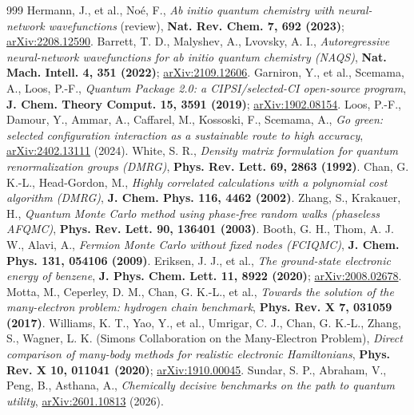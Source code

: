 \documentclass[11pt]{article}
\begin{document}
\begin{thebibliography}{999}
 Hermann, J., et al., Noé, F., \emph{Ab initio quantum chemistry with neural-network wavefunctions} (review), \textbf{Nat. Rev. Chem. 7, 692 (2023)}; \href{https://arxiv.org/abs/2208.12590}{arXiv:2208.12590}.
 Barrett, T. D., Malyshev, A., Lvovsky, A. I., \emph{Autoregressive neural-network wavefunctions for ab initio quantum chemistry (NAQS)}, \textbf{Nat. Mach. Intell. 4, 351 (2022)}; \href{https://arxiv.org/abs/2109.12606}{arXiv:2109.12606}.
 Garniron, Y., et al., Scemama, A., Loos, P.-F., \emph{Quantum Package 2.0: a CIPSI/selected-CI open-source program}, \textbf{J. Chem. Theory Comput. 15, 3591 (2019)}; \href{https://arxiv.org/abs/1902.08154}{arXiv:1902.08154}.
 Loos, P.-F., Damour, Y., Ammar, A., Caffarel, M., Kossoski, F., Scemama, A., \emph{Go green: selected configuration interaction as a sustainable route to high accuracy}, \href{https://arxiv.org/abs/2402.13111}{arXiv:2402.13111} (2024).
 White, S. R., \emph{Density matrix formulation for quantum renormalization groups (DMRG)}, \textbf{Phys. Rev. Lett. 69, 2863 (1992)}.
 Chan, G. K.-L., Head-Gordon, M., \emph{Highly correlated calculations with a polynomial cost algorithm (DMRG)}, \textbf{J. Chem. Phys. 116, 4462 (2002)}.
 Zhang, S., Krakauer, H., \emph{Quantum Monte Carlo method using phase-free random walks (phaseless AFQMC)}, \textbf{Phys. Rev. Lett. 90, 136401 (2003)}.
 Booth, G. H., Thom, A. J. W., Alavi, A., \emph{Fermion Monte Carlo without fixed nodes (FCIQMC)}, \textbf{J. Chem. Phys. 131, 054106 (2009)}.
 Eriksen, J. J., et al., \emph{The ground-state electronic energy of benzene}, \textbf{J. Phys. Chem. Lett. 11, 8922 (2020)}; \href{https://arxiv.org/abs/2008.02678}{arXiv:2008.02678}.
 Motta, M., Ceperley, D. M., Chan, G. K.-L., et al., \emph{Towards the solution of the many-electron problem: hydrogen chain benchmark}, \textbf{Phys. Rev. X 7, 031059 (2017)}.
 Williams, K. T., Yao, Y., et al., Umrigar, C. J., Chan, G. K.-L., Zhang, S., Wagner, L. K. (Simons Collaboration on the Many-Electron Problem), \emph{Direct comparison of many-body methods for realistic electronic Hamiltonians}, \textbf{Phys. Rev. X 10, 011041 (2020)}; \href{https://arxiv.org/abs/1910.00045}{arXiv:1910.00045}.
 Sundar, S. P., Abraham, V., Peng, B., Asthana, A., \emph{Chemically decisive benchmarks on the path to quantum utility}, \href{https://arxiv.org/abs/2601.10813}{arXiv:2601.10813} (2026).

\end{thebibliography}
\end{document}
